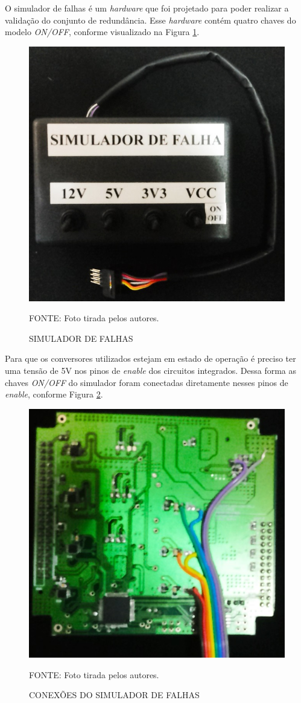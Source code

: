 \documentclass[
	12pt,				%
	openright,			%
	oneside,			%
	a4paper,			%
	english,			%
	french,				%
	spanish,			%
	brazil,				%
	oldfontcommands
	]{abntex2}
\begin{document}
	O simulador de falhas é um \textit{hardware} que foi projetado para poder realizar a validação do conjunto de redundância. Esse \textit{hardware} contém quatro chaves do modelo \textit{ON/OFF}, conforme visualizado na Figura \ref{Fig_Simulador}.
	
	\begin{figure}[th]
		\caption{SIMULADOR DE FALHAS}
		\label{Fig_Simulador}
		\centering
		\includegraphics[width=0.4\linewidth]{./figs/Simulador}
			
		\begin{small}
			FONTE: Foto tirada pelos autores.
		\end{small}		
	\end{figure}
	\pagebreak

	Para que os conversores utilizados estejam em estado de operação é preciso ter uma tensão de 5V nos pinos de \textit{enable} dos circuitos integrados. Dessa forma as chaves \textit{ON/OFF} do simulador foram conectadas diretamente nesses pinos de \textit{enable}, conforme Figura \ref{Fig_Simulador_Enable}.
		
	\begin{figure}[th]
		\caption{CONEXÕES DO SIMULADOR DE FALHAS}
		\label{Fig_Simulador_Enable}
		\centering
		\includegraphics[width=0.5\linewidth]{./figs/simulador_conexao}
			
		\begin{small}
			FONTE: Foto tirada pelos autores.
		\end{small}		
	\end{figure}
	
\end{document}
